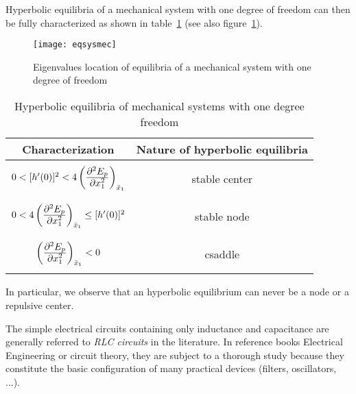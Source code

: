 Hyperbolic equilibria of a mechanical system with one degree of freedom can then be fully characterized as shown in table~\ref{tab:tabsysmec} (see also figure~\ref{fig:eqsysmec}).
\begin{figure}[t] 
   \centering
   \texttt{[image: eqsysmec]} 
   \caption{Eigenvalues location of equilibria of a mechanical system with one degree of freedom}
   \label{fig:eqsysmec}
\end{figure}
\begin{table}
\hspace*{5mm}
\begin{tabular}{|c|c|}
\hline
Characterization&Nature of hyperbolic equilibria\\ \hline
{}&{}\\
$0< [h'(0)]^2 <4 \left (\frac{{\textstyle \partial^2E_p}}{{\textstyle \partial x_1^2}}\right
)_{\bar x_1}$&stable center \\
{}&{}\\ \hline
{}&{}\\
$0<4 \left (\frac{{\textstyle \partial^2E_p}}{{\textstyle \partial x_1^2}}\right
)_{\bar x_1}\leq [h'(0)]^2$&stable node \\
{}&{}\\
 \hline
 {}&{}\\
$\left (\frac{{\textstyle \partial^2E_p}}{{\textstyle \partial x_1^2}}\right
)_{\bar x_1} <0$&csaddle \\ 
{}&{}\\
\hline
\end{tabular}
\caption{
Hyperbolic equilibria of mechanical systems with one degree
freedom}
\label{tab:tabsysmec}
\end{table}
In particular, we observe that an hyperbolic equilibrium can never be a node or a repulsive center.


The simple electrical circuits containing only inductance and capacitance are generally referred to {\em RLC circuits} in the literature. In reference books
Electrical Engineering or circuit theory, they are subject
to a thorough study because they constitute the basic configuration of many practical devices (filters, oscillators, ...).

